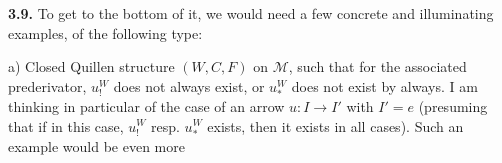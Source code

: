 \documentclass[11pt]{article}
\newcommand{\M}{\mathcal{M}}
\begin{document}
\textbf{3.9.} To get to the bottom of it, we would need a few concrete and illuminating examples, of the following type:

a) Closed Quillen structure $(W,C,F)$ on $\M$, such that for the associated prederivator, $u^{W}_{!}$ does not always exist, or $u^{W}_{*}$ does not exist by always. I am thinking in particular of the case of an arrow $u : I\longrightarrow I'$ with $I'=e$ (presuming that if in this case, $u^{W}_{!}$ resp. $u^{W}_{*}$ exists, then it exists in all cases). Such an example would be even more %
\end{document}
